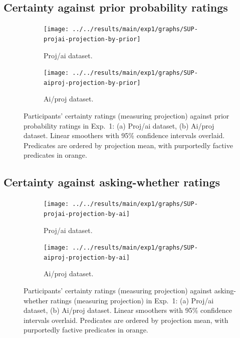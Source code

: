 \documentclass[11pt,fleqn]{article}
\newcommand{\6}{\mbox{$[\hspace*{-.6mm}[$}}
\newcommand{\9}{\mbox{$]\hspace*{-.6mm}]$}}
\begin{document}
\subsection{Certainty against prior probability ratings}

\begin{figure}[h!]
\centering
\begin{subfigure}[t]{0.49\textwidth}
\centering
\texttt{[image: ../../results/main/exp1/graphs/SUP-projai-projection-by-prior]}
\caption{Proj/ai dataset.}
\end{subfigure} \hfill \begin{subfigure}[t]{0.49\textwidth}
\centering
\texttt{[image: ../../results/main/exp1/graphs/SUP-aiproj-projection-by-prior]}
\caption{Ai/proj dataset.}
 \end{subfigure}
 
  
\caption{Participants' certainty ratings (measuring projection) against prior probability ratings in Exp.~1: (a) Proj/ai dataset, (b) Ai/proj dataset. Linear smoothers with 95\% confidence intervals overlaid. Predicates are ordered by projection mean, with purportedly factive predicates in orange.}
\end{figure}

\newpage

\subsection{Certainty against asking-whether ratings}

\begin{figure}[h!]
\centering
\begin{subfigure}[t]{0.49\textwidth}
\centering
\texttt{[image: ../../results/main/exp1/graphs/SUP-projai-projection-by-ai]}
\caption{Proj/ai dataset.}
\end{subfigure} \hfill \begin{subfigure}[t]{0.49\textwidth}
\centering
\texttt{[image: ../../results/main/exp1/graphs/SUP-aiproj-projection-by-ai]}
\caption{Ai/proj dataset.}
 \end{subfigure}
 
  
\caption{Participants' certainty ratings (measuring projection) against asking-whether ratings (measuring projection) in Exp.~1: (a) Proj/ai dataset, (b) Ai/proj dataset. Linear smoothers with 95\% confidence intervals overlaid. Predicates are ordered by projection mean, with purportedly factive predicates in orange.}
\end{figure}
\end{document}
